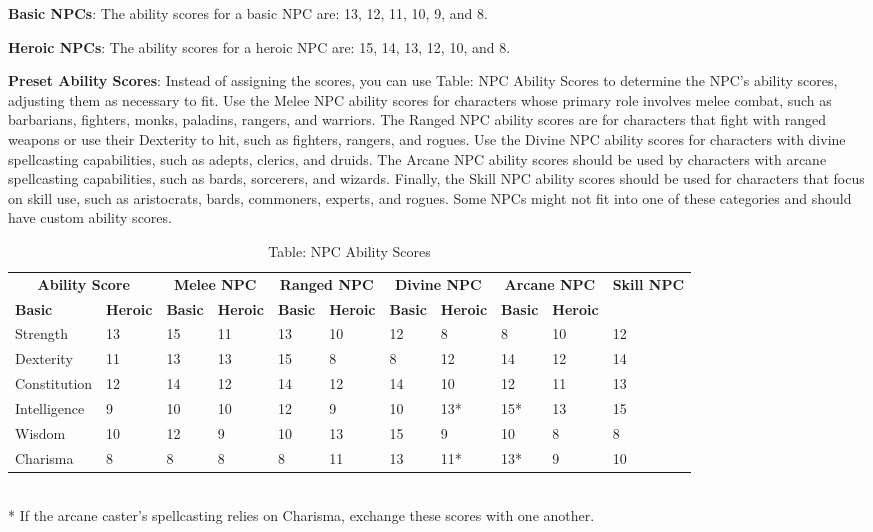 \textbf{Basic NPCs}: The ability scores for a basic NPC are: 13, 12, 11, 10, 9, and 8.
				
\textbf{Heroic NPCs}: The ability scores for a heroic NPC are: 15, 14, 13, 12, 10, and 8.
				
\textbf{Preset Ability Scores}: Instead of assigning the scores, you can use Table: NPC Ability Scores to determine the NPC's ability scores, adjusting them as necessary to fit. Use the Melee NPC ability scores for characters whose primary role involves melee combat, such as barbarians, fighters, monks, paladins, rangers, and warriors. The Ranged NPC ability scores are for characters that fight with ranged weapons or use their Dexterity to hit, such as fighters, rangers, and rogues. Use the Divine NPC ability scores for characters with divine spellcasting capabilities, such as adepts, clerics, and druids. The Arcane NPC ability scores should be used by characters with arcane spellcasting capabilities, such as bards, sorcerers, and wizards. Finally, the Skill NPC ability scores should be used for characters that focus on skill use, such as aristocrats, bards, commoners, experts, and rogues. Some NPCs might not fit into one of these categories and should have custom ability scores.

\begin{table*}[]
\sffamily
\caption{Table: NPC Ability Scores}
\begin{tabular}{llllllllllll}
\multicolumn{2}{c}{\textbf{Ability Score}} & \multicolumn{2}{c}{\textbf{Melee NPC}} & \multicolumn{2}{c}{\textbf{Ranged NPC}} & \multicolumn{2}{c}{\textbf{Divine NPC}} & \multicolumn{2}{c}{\textbf{Arcane NPC}} & \multicolumn{2}{c}{\textbf{Skill NPC}}\\
\textbf{Basic} & \textbf{Heroic} & \textbf{Basic} & \textbf{Heroic} &\textbf{Basic} & \textbf{Heroic} &\textbf{Basic} & \textbf{Heroic} &\textbf{Basic} & \textbf{Heroic} \\
Strength & 13 & 15 & 11 & 13 & 10 & 12 & 8 & 8 & 10 & 12 \\
 Dexterity & 11 & 13 & 13 & 15 & 8 & 8 & 12 & 14 & 12 & 14 \\
 Constitution & 12 & 14 & 12 & 14 & 12 & 14 & 10 & 12 & 11 & 13 \\
 Intelligence & 9 & 10 & 10 & 12 & 9 & 10 & 13* & 15* & 13 & 15 \\
 Wisdom & 10 & 12 & 9 & 10 & 13 & 15 & 9 & 10 & 8 & 8 \\
 Charisma & 8 & 8 & 8 & 8 & 11 & 13 & 11* & 13* & 9 & 10\\
\end{tabular}\\
* If the arcane caster's spellcasting relies on Charisma, exchange these scores with one another.\\
\end{table*}

